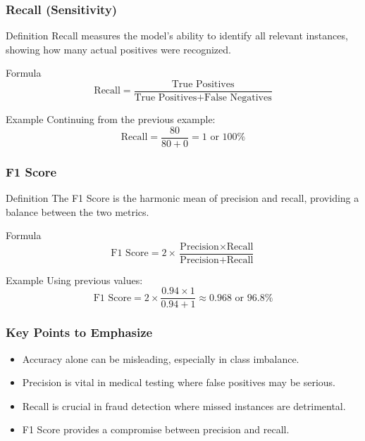 \documentclass[aspectratio=169]{beamer}
\begin{document}
\begin{frame}[fragile]
    \frametitle{Recall (Sensitivity)}
    \begin{block}{Definition}
        Recall measures the model’s ability to identify all relevant instances, showing how many actual positives were recognized.
    \end{block}
    \begin{block}{Formula}
        \begin{equation}
        \text{Recall} = \frac{\text{True Positives}}{\text{True Positives} + \text{False Negatives}}
        \end{equation}
    \end{block}
    \begin{block}{Example}
        Continuing from the previous example:
        \begin{equation}
        \text{Recall} = \frac{80}{80 + 0} = 1 \text{ or } 100\%
        \end{equation}
    \end{block}
\end{frame}

\begin{frame}[fragile]
    \frametitle{F1 Score}
    \begin{block}{Definition}
        The F1 Score is the harmonic mean of precision and recall, providing a balance between the two metrics.
    \end{block}
    \begin{block}{Formula}
        \begin{equation}
        \text{F1 Score} = 2 \times \frac{\text{Precision} \times \text{Recall}}{\text{Precision} + \text{Recall}}
        \end{equation}
    \end{block}
    \begin{block}{Example}
        Using previous values:
        \begin{equation}
        \text{F1 Score} = 2 \times \frac{0.94 \times 1}{0.94 + 1} \approx 0.968 \text{ or } 96.8\%
        \end{equation}
    \end{block}
\end{frame}

\begin{frame}[fragile]
    \frametitle{Key Points to Emphasize}
    \begin{itemize}
        \item Accuracy alone can be misleading, especially in class imbalance.
        \item Precision is vital in medical testing where false positives may be serious.
        \item Recall is crucial in fraud detection where missed instances are detrimental.
        \item F1 Score provides a compromise between precision and recall.
    \end{itemize}
\end{frame}
\end{document}
